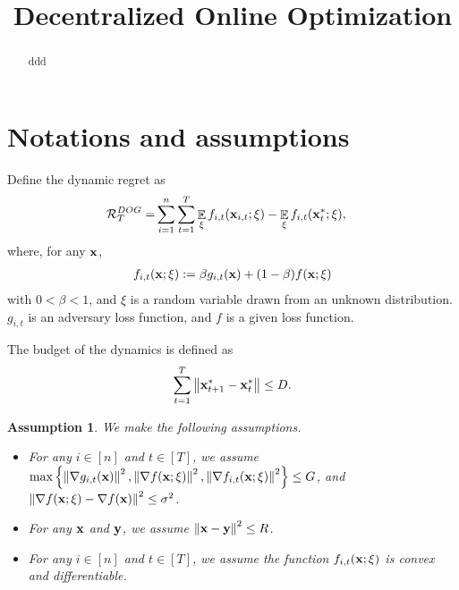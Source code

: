\documentclass{article}
\title{Decentralized Online Optimization}
\newtheorem{Assumption}{\bf{Assumption}}
\begin{document}
\maketitle

\begin{abstract}
ddd
\end{abstract}

\section{Notations and assumptions}





Define the dynamic regret as
\begin{align}
\nonumber
{\mathcal{R}}_T^{DOG} = & \sum_{i=1}^n\sum_{t=1}^T \mathop{\mathbb{E}}_{\xi}f_{i,t}({\bf x}_{i,t};\xi) - \mathop{\mathbb{E}}_{\xi}f_{i,t}({\bf x}_t^\ast;\xi),
\end{align} where, for any ${\bf x}$,
\begin{align}
\nonumber
f_{i,t}({\bf x};\xi) := \beta g_{i,t}({\bf x}) + (1-\beta) f({\bf x}; \xi)
\end{align} with $0<\beta<1$, and $\xi$ is a random variable drawn from an unknown distribution. $g_{i,t}$ is an adversary loss function, and $f$ is a given loss function.



The budget of the dynamics is defined as
\begin{align}
\nonumber
\sum_{t=1}^T \left\lVert{\bf x}_{t+1}^\ast - {\bf x}_t^\ast\right\rVert \le D.
\end{align}



\begin{Assumption}
\label{assumption_bounded_gradient_domain}
We make the following assumptions.
\begin{itemize}
\item For any $i\in[n]$ and $t\in[T]$, we assume $\max\left\{\left\lVert\nabla g_{i,t}({\bf x})\right\rVert^2, \left\lVert\nabla f({\bf x};\xi)\right\rVert^2, \left\lVert\nabla f_{i,t}({\bf x}; \xi)\right\rVert^2 \right\} \le G$, and $\left\lVert\nabla f({\bf x}; \xi) - \nabla f({\bf x})\right\rVert^2 \le \sigma^2$.
\item For any ${\bf x}$ and ${\bf y}$, we assume $\left\lVert{\bf x}-{\bf y}\right\rVert^2 \le R$.
\item For any $i\in[n]$ and $t\in[T]$, we assume the function $f_{i,t}({\bf x};\xi)$ is convex and differentiable.
\end{itemize}

 
\end{Assumption}
\end{document}
